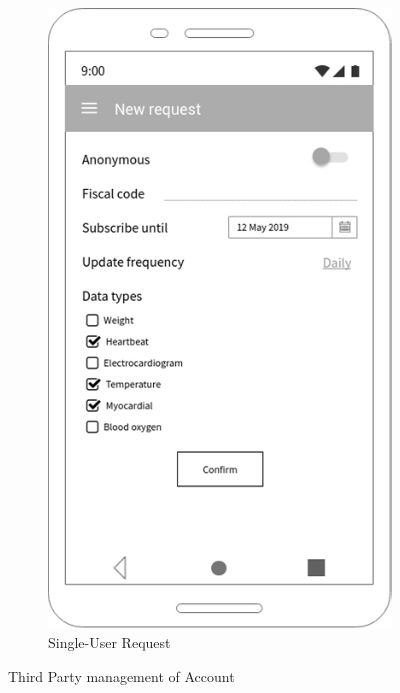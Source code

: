 \begin{figure}[h!]
\begin{subfigure}[b]{0.25\linewidth}
    \includegraphics[width=\linewidth]{img/mockup/tp_sreq.jpg}

    \caption{Single-User Request}

  \end{subfigure}

\caption{Third Party management of Account }

 \end{figure}


